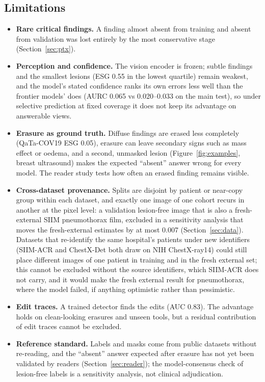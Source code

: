 \documentclass[11pt]{article}
\begin{document}
\subsection{Limitations}\label{sec:limits}
\begin{itemize}[leftmargin=*,nosep]
\item \textbf{Rare critical findings.} A finding almost absent from training and absent from validation was lost entirely by the most conservative stage (Section~\ref{sec:ptx}).
\item \textbf{Perception and confidence.} The vision encoder is frozen; subtle findings and the smallest lesions (ESG 0.55 in the lowest quartile) remain weakest, and the model's stated confidence ranks its own errors less well than the frontier models' does (AURC 0.065 vs 0.020--0.033 on the main test), so under selective prediction at fixed coverage it does not keep its advantage on answerable views.
\item \textbf{Erasure as ground truth.} Diffuse findings are erased less completely (QaTa-COV19 ESG 0.05), erasure can leave secondary signs such as mass effect or oedema, and a second, unmasked lesion (Figure~\ref{fig:examples}, breast ultrasound) makes the expected ``absent'' answer wrong for every model. The reader study tests how often an erased finding remains visible.
\item \textbf{Cross-dataset provenance.} Splits are disjoint by patient or near-copy group within each dataset, and exactly one image of one cohort recurs in another at the pixel level: a validation lesion-free image that is also a fresh-external SIIM pneumothorax film, excluded in a sensitivity analysis that moves the fresh-external estimates by at most 0.007 (Section~\ref{sec:data}). Datasets that re-identify the same hospital's patients under new identifiers (SIIM-ACR and ChestX-Det both draw on NIH ChestX-ray14) could still place different images of one patient in training and in the fresh external set; this cannot be excluded without the source identifiers, which SIIM-ACR does not carry, and it would make the fresh external result for pneumothorax, where the model failed, if anything optimistic rather than pessimistic.
\item \textbf{Edit traces.} A trained detector finds the edits (AUC 0.83). The advantage holds on clean-looking erasures and unseen tools, but a residual contribution of edit traces cannot be excluded.
\item \textbf{Reference standard.} Labels and masks come from public datasets without re-reading, and the ``absent'' answer expected after erasure has not yet been validated by readers (Section~\ref{sec:reader}); the model-consensus check of lesion-free labels is a sensitivity analysis, not clinical adjudication.

\end{itemize}
\end{document}
